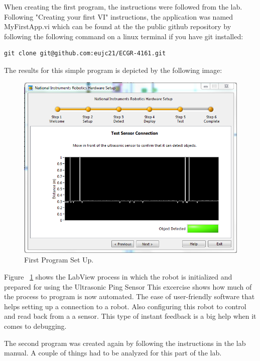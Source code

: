 \documentclass{scrartcl}
\begin{document}
When creating the first program, the instructions were followed from the lab. Following "Creating your first VI" instructions, the application was named MyFirstApp.vi which can be found at the the public github repository by following the following command on a linux terminal if you have git installed:
\begin{lstlisting}
git clone git@github.com:eujc21/ECGR-4161.git
\end{lstlisting}
The results for this simple program is depicted by the following image:
\begin{figure}[H]
  \centering
    \includegraphics[width=1\textwidth]{configuration_setup.png}
    \caption{First Program Set Up.}
    \label{fig:first}
\end{figure}

Figure  ~\ref{fig:first}  shows the LabView process in which the robot is initialized and prepared for using the Ultrasonic Ping Sensor
This excercise shows how much of the process to program is now automated. The ease of user-friendly software that helps setting up a  connection to a robot. Also configuring this robot to control and read back from a a sensor. This type of instant feedback is a big help when it comes to debugging.

The second program was created again by following the instructions in the lab manual. A couple of things had to be analyzed for this part of the lab.
\end{document}
